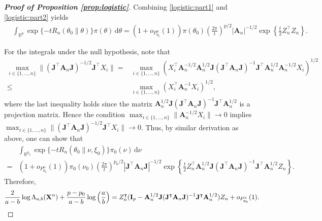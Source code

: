 \documentclass[11pt]{article}
\newcommand{\BA}{\mathbf{A}}    \newcommand{\BB}{\mathbf{B}}    \newcommand{\BC}{\mathbf{C}}    \newcommand{\BD}{\mathbf{D}}    \newcommand{\BE}{\mathbf{E}}    \newcommand{\BF}{\mathbf{F}}    \newcommand{\BG}{\mathbf{G}}    \newcommand{\BH}{\mathbf{H}}    \newcommand{\BI}{\mathbf{I}}    \newcommand{\BJ}{\mathbf{J}}    \newcommand{\BK}{\mathbf{K}}    \newcommand{\BL}{\mathbf{L}}
\newcommand{\myT}{\intercal}
\theoremstyle{plain}
\theoremstyle{definition}
\theoremstyle{remark}
\begin{document}
\begin{appendices}
\begin{proof}[\textbf{Proof of Proposition \ref{prop:logistic}}]
Combining \eqref{logistic:part1} and \eqref{logistic:part2} yields
\begin{align*}
    &
    \int_{\mathbb R^p} 
    \exp\{-t R_n (\theta_0 \| \theta)\} \pi(\theta) \, \mathrm d \theta
    =
    (1+o_{P_{\theta_0}^n}(1))\pi(\theta_0)
\left( \frac {2\pi}{t} \right)^{p/2} |\BA_n|^{-1/2} \exp \left\{\frac{t}{2} Z_n^\myT Z_n \right\}.
\end{align*}

For the integrals under the null hypothesis, note that
\begin{align*}
     \max_{i\in \{1,\dots,n\}}
     \|(\BJ^\myT \BA_n \BJ)^{-1/2}
 \BJ^\myT X_i\| 
 =&
     \max_{i\in \{1,\dots,n\}}
     \left(
 X_i^\myT
\BA_n^{-1/2}
\BA_n^{1/2}
 \BJ
     (\BJ^\myT \BA_n \BJ)^{-1}
 \BJ^\myT 
\BA_n^{1/2}
\BA_n^{-1/2}
 X_i
\right)^{1/2}
\\
\leq &
     \max_{i\in \{1,\dots,n\}}
     \left(
 X_i^\myT
\BA_n^{-1}
 X_i
\right)^{1/2}
,
\end{align*}
where the last inequality holds since the matrix
$
\BA_n^{1/2}
 \BJ
     (\BJ^\myT \BA_n \BJ)^{-1}
 \BJ^\myT 
\BA_n^{1/2}
$
is a projection matrix.
Hence the condition 
$
     \max_{i\in \{1,\dots,n\}}
 \|\BA_n^{-1/2}
 X_i\| \to 0
$
implies
$
     \max_{i\in \{1,\dots,n\}}
     \|(\BJ^\myT \BA_n \BJ)^{-1/2}
 \BJ^\myT X_i\| 
 \to 0
 $.
 Thus, by similar derivation as above, one can show that
\begin{align*}
    &
    \int_{\mathbb R^{p_0}} 
    \exp\{-t R_n (\theta_0 \| \nu, \xi_0)\} \pi_0(\nu) \, \mathrm d \nu
    \\
    =&
    (1+o_{P_{\theta_0}^n}(1))\pi_0(\nu_0)
\left( \frac {2\pi}{t} \right)^{p_0 /2} |\BJ^\myT \BA_n \BJ|^{-1/2} \exp \left\{\frac{t}{2} Z_n^\myT \BA_n^{1/2} \BJ ( \BJ^\myT \BA_n \BJ )^{-1} \BJ^\myT \BA_n^{1/2}  Z_n \right\}.
\end{align*}
Therefore,
\begin{align}\label{logistic:contiguous}
    \frac{2}{a-b}\log \Lambda_{a, b} (\BX^n)
    +
    \frac{p-p_0}{a-b} \log \left(\frac{a}{b}\right)
    = 
    Z_n^\myT
    (
        \BI_p-
    \BA_n^{1/2} \BJ ( \BJ^\myT \BA_n \BJ )^{-1} \BJ^\myT \BA_n^{1/2}  
)
Z_n
+
o_{P_{\theta_0}^n}(1)
.
\end{align}


\end{proof}
\end{appendices}
\end{document}
